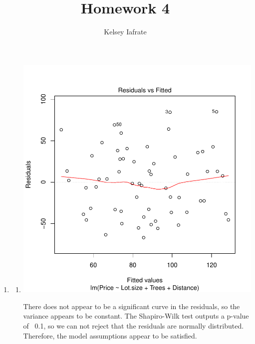 \documentclass[]{article}
\title{Homework 4}
\author{Kelsey Iafrate}
\begin{document}
\maketitle



\begin{enumerate}

\item

\begin{enumerate}

\item


\begin{Schunk}
\end{Schunk}
\includegraphics{Homework4-001}

There does not appear to be a significant curve in the residuals, so the variance appears to be constant. The Shapiro-Wilk test outputs a p-value of ~0.1, so we can not reject that the residuals are normally distributed. Therefore, the model assumptions appear to be satisfied. 


\end{enumerate}
\end{enumerate}
\end{document}
